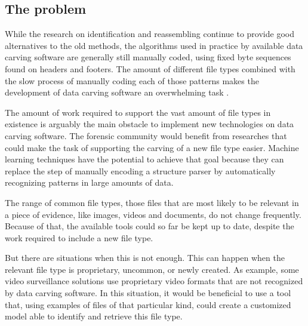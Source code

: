 \subsection{The problem}
While the research on identification and reassembling continue to provide good alternatives to the old methods, the algorithms used in practice by available data carving software are generally still manually coded, using fixed byte sequences found on headers and footers. The amount of different file types combined with the slow process of manually coding each of those patterns makes the development of data carving software an overwhelming task \cite{mcdaniel_content_2003}. 



The amount of work required to support the vast amount of file types in existence is arguably the main obstacle to implement new technologies on data carving software. The forensic community would benefit from researches that could make the task of supporting the carving of a new file type easier. Machine learning techniques have the potential to achieve that goal because they can replace the step of manually encoding a structure parser by automatically recognizing patterns in large amounts of data.

The range of common file types, those files that are most likely to be relevant in a piece of evidence, like images, videos and documents, do not change frequently. Because of that, the available tools could so far be kept up to date, despite the work required to include a new file type.

But there are situations when this is not enough. This can happen when the relevant file type is proprietary, uncommon, or newly created. As example, some video surveillance solutions use proprietary video formats that are not recognized by data carving software. In this situation, it would be beneficial to use a tool that, using examples of files of that particular kind, could create a customized model able to identify and retrieve this file type.
